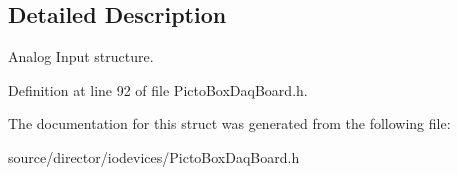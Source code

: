 \subsection{Detailed Description}
Analog Input structure. 

Definition at line 92 of file Picto\-Box\-Daq\-Board.\-h.



The documentation for this struct was generated from the following file\-:\begin{DoxyCompactItemize}
\item 
source/director/iodevices/Picto\-Box\-Daq\-Board.\-h\end{DoxyCompactItemize}
